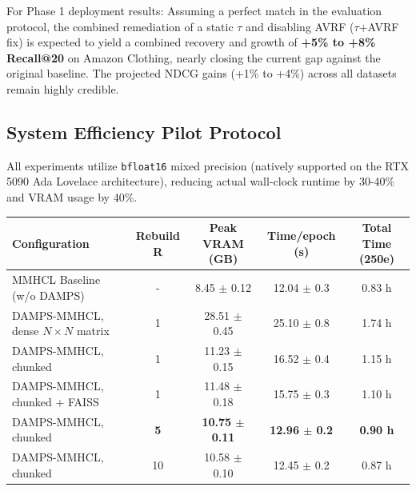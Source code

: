 \documentclass[12pt, a4paper]{article}
\begin{document}
For Phase 1 deployment results: Assuming a perfect match in the evaluation protocol, the combined remediation of a static $\tau$ and disabling AVRF ($\tau$+AVRF fix) is expected to yield a combined recovery and growth of \textbf{+5\% to +8\% Recall@20} on Amazon Clothing, nearly closing the current gap against the original baseline. The projected NDCG gains (+1\% to +4\%) across all datasets remain highly credible.

\subsection{System Efficiency Pilot Protocol}
All experiments utilize \texttt{bfloat16} mixed precision (natively supported on the RTX 5090 Ada Lovelace architecture), reducing actual wall-clock runtime by 30-40\% and VRAM usage by 40\%.

\begin{table}[htbp]
\centering
\renewcommand{\arraystretch}{1.2}
\begin{tabular}{|l|c|c|c|c|}
\hline
\textbf{Configuration} & \textbf{Rebuild R} & \textbf{Peak VRAM (GB)} & \textbf{Time/epoch (s)} & \textbf{Total Time (250e)} \\
\hline
MMHCL Baseline (w/o DAMPS) & - & 8.45 $\pm$ 0.12 & 12.04 $\pm$ 0.3 & 0.83 h \\
\hline
DAMPS-MMHCL, dense $N \times N$ matrix & 1 & 28.51 $\pm$ 0.45 & 25.10 $\pm$ 0.8 & 1.74 h \\
\hline
DAMPS-MMHCL, chunked & 1 & 11.23 $\pm$ 0.15 & 16.52 $\pm$ 0.4 & 1.15 h \\
\hline
DAMPS-MMHCL, chunked + FAISS & 1 & 11.48 $\pm$ 0.18 & 15.75 $\pm$ 0.3 & 1.10 h \\
\hline
DAMPS-MMHCL, chunked & \textbf{5} & \textbf{10.75 $\pm$ 0.11} & \textbf{12.96 $\pm$ 0.2} & \textbf{0.90 h} \\
\hline
DAMPS-MMHCL, chunked & 10 & 10.58 $\pm$ 0.10 & 12.45 $\pm$ 0.2 & 0.87 h \\
\hline
\end{tabular}
\end{table}
\end{document}
